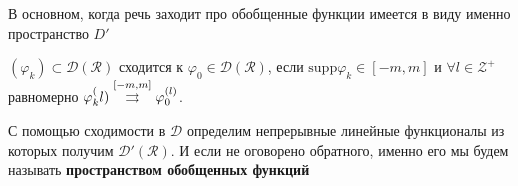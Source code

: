 В основном, когда речь заходит про обобщенные функции имеется в виду именно пространство $D'$
\begin{to_def}
	$(\varphi_k) \subset \mathcal{D}(\mathcal{R})$ сходится к $\varphi_0 \in \mathcal{D}(\mathcal{R})$, если $\text{supp} \varphi_k \in [-m, m]$ и $\forall l \in \mathcal{Z}^+$ равномерно $\varphi_k^(l) \overset{[-m, m]}{\rightrightarrows} \varphi_0^{(l)}$.
\end{to_def}

С помощью сходимости в $\mathcal{D}$ определим непрерывные линейные функционалы из которых получим $\mathcal{D}'(\mathcal{R})$. И если не оговорено обратного, именно его мы будем называть \textbf{пространством обобщенных функций} 